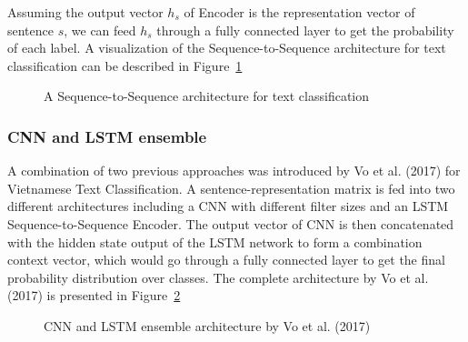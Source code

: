 \documentclass[pdflatex,sn-mathphys]{sn-jnl}%
\theoremstyle{thmstyleone}%
\theoremstyle{thmstyletwo}%
\theoremstyle{thmstylethree}%
\begin{document}
Assuming the output vector $h_s$ of Encoder is the representation vector of sentence $s$, we can feed $h_s$ through a fully connected layer to get the probability of each label. A visualization of the Sequence-to-Sequence architecture for text classification can be described in Figure~\ref{fig:seq2seq-classification}

\begin{figure}[htp]
\centering
{}
\caption{A Sequence-to-Sequence architecture for text classification}
\label{fig:seq2seq-classification}
\end{figure}

\subsubsection{CNN and LSTM ensemble}
A combination of two previous approaches was introduced by Vo et al. (2017)\cite{Vo2017} for Vietnamese Text Classification. A sentence-representation matrix is fed into two different architectures including a CNN with different filter sizes and an LSTM Sequence-to-Sequence Encoder. The output vector of CNN is then concatenated with the hidden state output of the LSTM network to form a combination context vector, which would go through a fully connected layer to get the final probability distribution over classes. The complete architecture by Vo et al. (2017) is presented in Figure~\ref{fig:vo2017}

\begin{figure}[htp]
\centering
{}
\caption{CNN and LSTM ensemble architecture by Vo et al. (2017)\cite{Vo2017}}
\label{fig:vo2017}
\end{figure}
\end{document}
